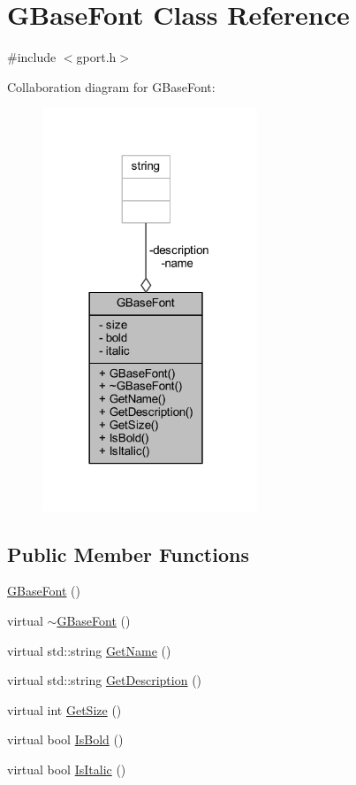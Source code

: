 \hypertarget{class_g_base_font}{}\section{G\+Base\+Font Class Reference}
\label{class_g_base_font}


{\ttfamily \#include $<$gport.\+h$>$}



Collaboration diagram for G\+Base\+Font\+:\nopagebreak
\begin{figure}[H]
\begin{center}
\leavevmode
\includegraphics[width=182pt]{class_g_base_font__coll__graph}
\end{center}
\end{figure}
\subsection*{Public Member Functions}
\begin{DoxyCompactItemize}
\item 
\mbox{\hyperlink{class_g_base_font_ae2afea9a892bb4d271f5fadb4566336b}{G\+Base\+Font}} ()
\item 
virtual \mbox{\hyperlink{class_g_base_font_a3517ce7aeadbbe9d77cab6e4a5aebe61}{$\sim$\+G\+Base\+Font}} ()
\item 
virtual std\+::string \mbox{\hyperlink{class_g_base_font_a202a60eadc6436354527de8ccd4a983d}{Get\+Name}} ()
\item 
virtual std\+::string \mbox{\hyperlink{class_g_base_font_a223b6eee3ba7e714d5dbb763ee4e3f9a}{Get\+Description}} ()
\item 
virtual int \mbox{\hyperlink{class_g_base_font_a62e761a8a0c0f60f01d8a0d451640e69}{Get\+Size}} ()
\item 
virtual bool \mbox{\hyperlink{class_g_base_font_a22abd1f8dfcda6124ffedb8dc26bfcd3}{Is\+Bold}} ()
\item 
virtual bool \mbox{\hyperlink{class_g_base_font_aec31b5754f2be8ae2552b2bfd37a76d1}{Is\+Italic}} ()
\end{DoxyCompactItemize}
